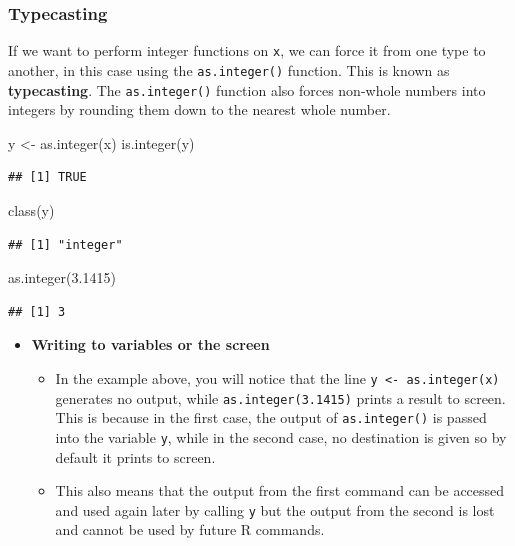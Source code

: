 \documentclass[a4paper]{book}
\newenvironment{Shaded}{}{}
\newcommand{\KeywordTok}[1]{\textcolor[rgb]{0.00,0.00,1.00}{{#1}}}
\newcommand{\FloatTok}[1]{{#1}}
\newcommand{\StringTok}[1]{\textcolor[rgb]{0.00,0.50,0.50}{{#1}}}
\newcommand{\NormalTok}[1]{{#1}}
\newlength{\leftbarwidth}
\newlength{\leftbarsep}
\newcommand*{\leftbarcolorcmd}{\color{darkgray}}%
\renewenvironment{leftbar}{%
    \def\FrameCommand{{\leftbarcolorcmd{\vrule width \leftbarwidth\relax\hspace {\leftbarsep}}}}%
    \MakeFramed {\advance \hsize -\width \FrameRestore }%
}{%
    \endMakeFramed
}
\renewenvironment{Shaded}
{\vspace{0em}\begin{leftbar}\begin{snugshade}}
{\end{snugshade}\end{leftbar}\vspace{0pt}}
\newenvironment{rmdblock}[1]
  {\vspace{1.5em}\begin{shaded*}
  \begin{itemize}
  \renewcommand{\labelitemi}{
    \raisebox{-.7\height}[0pt][0pt]{
      {\setkeys{Gin}{width=3em,keepaspectratio}\texttt{[image: images/\#1]}}
    }
  }
  \item
  }
  {
  \end{itemize}
  \end{shaded*}
  }
\newenvironment{rmdtip}
  {\begin{rmdblock}{tip}}
  {\end{rmdblock}}
\begin{document}
\subsubsection{Typecasting}\label{typecasting}

If we want to perform integer functions on \texttt{x}, we can force it
from one type to another, in this case using the \texttt{as.integer()}
function. This is known as \textbf{typecasting}. The
\texttt{as.integer()} function also forces non-whole numbers into
integers by rounding them down to the nearest whole number.

\begin{Shaded}
\begin{Highlighting}[]
\NormalTok{y <-}\StringTok{ }\KeywordTok{as.integer}\NormalTok{(x)}
\KeywordTok{is.integer}\NormalTok{(y)}
\end{Highlighting}
\end{Shaded}

\begin{verbatim}
## [1] TRUE
\end{verbatim}

\begin{Shaded}
\begin{Highlighting}[]
\KeywordTok{class}\NormalTok{(y)}
\end{Highlighting}
\end{Shaded}

\begin{verbatim}
## [1] "integer"
\end{verbatim}

\begin{Shaded}
\begin{Highlighting}[]
\KeywordTok{as.integer}\NormalTok{(}\FloatTok{3.1415}\NormalTok{)}
\end{Highlighting}
\end{Shaded}

\begin{verbatim}
## [1] 3
\end{verbatim}

\begin{rmdtip}
\textbf{Writing to variables or the screen}

\begin{itemize}
\item
  In the example above, you will notice that the line
  \texttt{y\ \textless{}-\ as.integer(x)} generates no output, while
  \texttt{as.integer(3.1415)} prints a result to screen. This is because
  in the first case, the output of \texttt{as.integer()} is passed into
  the variable \texttt{y}, while in the second case, no destination is
  given so by default it prints to screen.
\item
  This also means that the output from the first command can be accessed
  and used again later by calling \texttt{y} but the output from the
  second is lost and cannot be used by future R commands.
\end{itemize}
\end{rmdtip}
\end{document}
